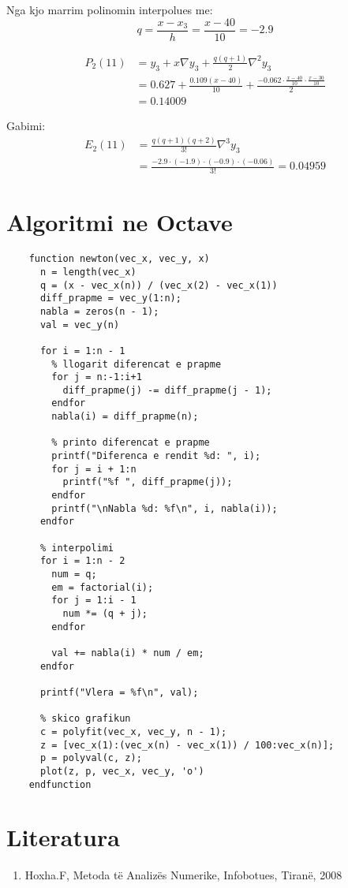 \documentclass[12pt, margin=1in, a4paper]{article}
\begin{document}
  Nga kjo marrim polinomin interpolues me:
  \begin{equation}
    q = \frac{x - x_3}{h} = \frac{x - 40}{10} = -2.9
  \end{equation}

  \begin{equation}
  \begin{aligned}
    P_2(11) &= y_3 + x\nabla y_3 + \frac{q(q + 1)}{2}\nabla^2y_3 \\
    &= 0.627 + \frac{0.109(x - 40)}{10} + \frac{-0.062 \cdot \frac{x - 40}{10} \cdot \frac{x - 30}{10}}{2} \\
    &= 0.14009
  \end{aligned}
  \end{equation}

  Gabimi:
  \begin{equation}
  \begin{aligned}
    E_2(11) &= \frac{q(q + 1)(q + 2)}{3!}\nabla^3y_3 \\
    &= \frac{-2.9 \cdot (-1.9) \cdot (-0.9) \cdot (-0.06)}{3!} = 0.04959
  \end{aligned}
  \end{equation}

  \newpage

\section{Algoritmi ne Octave}
  \begin{lstlisting}
    function newton(vec_x, vec_y, x)
      n = length(vec_x)
      q = (x - vec_x(n)) / (vec_x(2) - vec_x(1))
      diff_prapme = vec_y(1:n);
      nabla = zeros(n - 1);
      val = vec_y(n)
  
      for i = 1:n - 1
        % llogarit diferencat e prapme
        for j = n:-1:i+1
          diff_prapme(j) -= diff_prapme(j - 1);
        endfor
        nabla(i) = diff_prapme(n);
    
        % printo diferencat e prapme
        printf("Diferenca e rendit %d: ", i);
        for j = i + 1:n
          printf("%f ", diff_prapme(j));
        endfor
        printf("\nNabla %d: %f\n", i, nabla(i));
      endfor
  
      % interpolimi
      for i = 1:n - 2
        num = q;
        em = factorial(i);
        for j = 1:i - 1
          num *= (q + j);
        endfor

        val += nabla(i) * num / em;
      endfor
  
      printf("Vlera = %f\n", val);
  
      % skico grafikun
      c = polyfit(vec_x, vec_y, n - 1);
      z = [vec_x(1):(vec_x(n) - vec_x(1)) / 100:vec_x(n)];
      p = polyval(c, z);
      plot(z, p, vec_x, vec_y, 'o')
    endfunction
  \end{lstlisting}
  \newpage

\section{Literatura}
\begin{enumerate}
  \item Hoxha.F, Metoda të Analizës Numerike, Infobotues, Tiranë, 2008
\end{enumerate}
\end{document}
